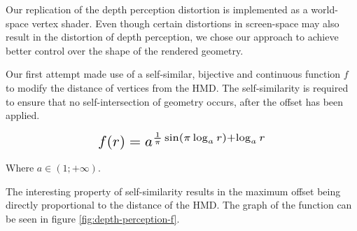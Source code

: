 Our replication of the depth perception distortion is implemented as a world-space vertex shader. Even though certain distortions in screen-space may also result in the distortion of depth perception, we chose our approach to achieve better control over the shape of the rendered geometry.

\label{sec:depth-first-attempt}
Our first attempt made use of a self-similar, bijective and continuous function $f$ to modify the distance of vertices from the \ac{HMD}. The self-similarity is required to ensure that no self-intersection of geometry occurs, after the offset has been applied.

\begin{equation}
    \scalebox{1.5}{
        $f(r) = a^{\frac{1}{\pi}\sin(\pi \log_a{r}) + \log_a{r}}$
    }
    \label{eq:depth-perception-f}
\end{equation}

Where $a \in (1; +\infty)$.

The interesting property of self-similarity results in the maximum offset being directly proportional to the distance of the \ac{HMD}. The graph of the function can be seen in figure \ref{fig:depth-perception-f}.

